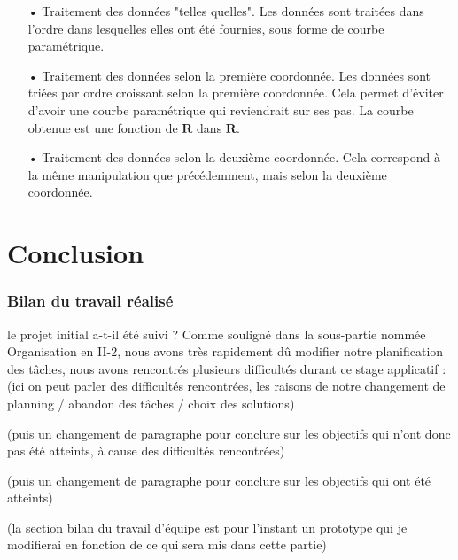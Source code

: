 \documentclass[a4paper,12pt]{article} %
\begin{document}
\begin{itemize}
    \item[•] Traitement des données "telles quelles". Les données sont traitées dans l'ordre dans lesquelles elles ont été fournies, sous forme de courbe paramétrique.
    \item[•] Traitement des données selon la première coordonnée. Les données sont triées par ordre croissant selon la première coordonnée. Cela permet d'éviter d'avoir une courbe paramétrique qui reviendrait sur ses pas. La courbe obtenue est une fonction de $\mathbf{R}$ dans $\mathbf{R}$.
    \item[•] Traitement des données selon la deuxième coordonnée. Cela correspond à la même manipulation que précédemment, mais selon la deuxième coordonnée.
\end{itemize}


\renewcommand\partname{}
\part{Conclusion}
	\section{Bilan du travail réalisé}
    le projet initial a-t-il été suivi ?
    Comme souligné dans la sous-partie nommée Organisation en II-2, nous avons très rapidement dû modifier notre planification des tâches, nous avons rencontrés plusieurs difficultés durant ce stage applicatif :
    (ici on peut parler des difficultés rencontrées, les raisons de notre changement de planning / abandon des tâches / choix des solutions)
    
    (puis un changement de paragraphe pour conclure sur les objectifs qui n'ont donc pas été atteints, à cause des difficultés rencontrées)
    
    (puis un changement de paragraphe pour conclure sur les objectifs qui ont été atteints)
    
    (la section bilan du travail d'équipe est pour l'instant un prototype qui je  modifierai en fonction de ce qui sera mis dans cette partie)
    
\end{document}
